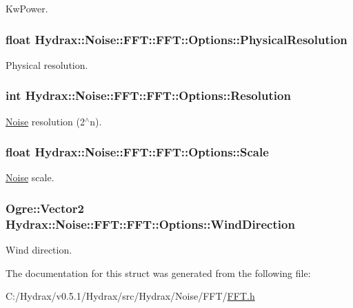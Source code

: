 KwPower. 

\hypertarget{struct_hydrax_1_1_noise_1_1_f_f_t_1_1_options_f1273c65d2872198ae6b3c1dfb150ff4}{
\subsubsection[{PhysicalResolution}]{\setlength{\rightskip}{0pt plus 5cm}float Hydrax::Noise::FFT::FFT::Options::PhysicalResolution}}
\label{struct_hydrax_1_1_noise_1_1_f_f_t_1_1_options_f1273c65d2872198ae6b3c1dfb150ff4}


Physical resolution. 

\hypertarget{struct_hydrax_1_1_noise_1_1_f_f_t_1_1_options_5e7cb0d860838ae205212b13aad05a4b}{
\subsubsection[{Resolution}]{\setlength{\rightskip}{0pt plus 5cm}int Hydrax::Noise::FFT::FFT::Options::Resolution}}
\label{struct_hydrax_1_1_noise_1_1_f_f_t_1_1_options_5e7cb0d860838ae205212b13aad05a4b}


\hyperlink{class_hydrax_1_1_noise_1_1_noise}{Noise} resolution (2$^\wedge$n). 

\hypertarget{struct_hydrax_1_1_noise_1_1_f_f_t_1_1_options_98e3899bdfe6bf54910192543fbc374c}{
\subsubsection[{Scale}]{\setlength{\rightskip}{0pt plus 5cm}float Hydrax::Noise::FFT::FFT::Options::Scale}}
\label{struct_hydrax_1_1_noise_1_1_f_f_t_1_1_options_98e3899bdfe6bf54910192543fbc374c}


\hyperlink{class_hydrax_1_1_noise_1_1_noise}{Noise} scale. 

\hypertarget{struct_hydrax_1_1_noise_1_1_f_f_t_1_1_options_9ee024e08048211c6674f00d61496037}{
\subsubsection[{WindDirection}]{\setlength{\rightskip}{0pt plus 5cm}Ogre::Vector2 Hydrax::Noise::FFT::FFT::Options::WindDirection}}
\label{struct_hydrax_1_1_noise_1_1_f_f_t_1_1_options_9ee024e08048211c6674f00d61496037}


Wind direction. 



The documentation for this struct was generated from the following file:\begin{CompactItemize}
\item 
C:/Hydrax/v0.5.1/Hydrax/src/Hydrax/Noise/FFT/\hyperlink{_f_f_t_8h}{FFT.h}\end{CompactItemize}
